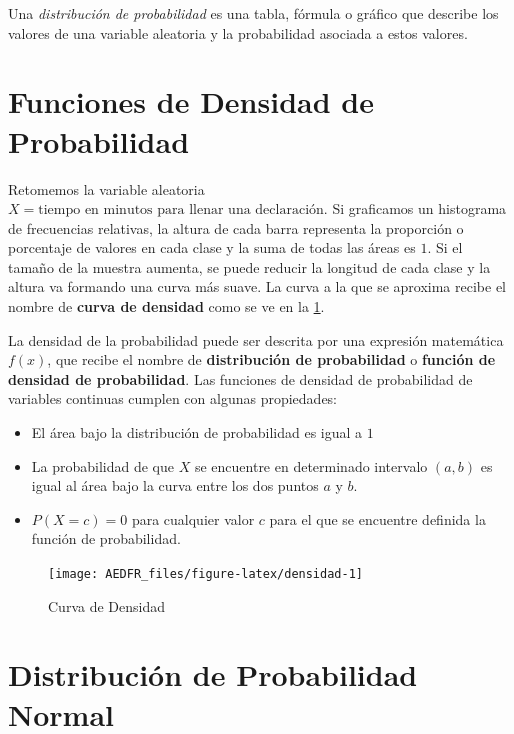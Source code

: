 \documentclass[letterpaper,]{book}
\providecommand{\tightlist}{%
  \setlength{\itemsep}{0pt}\setlength{\parskip}{0pt}}
\begin{document}
Una \emph{distribución de probabilidad} es una tabla, fórmula o gráfico que describe los valores de una variable aleatoria y la probabilidad asociada a estos valores.

\hypertarget{funciones-de-densidad-de-probabilidad}{%
\section{Funciones de Densidad de Probabilidad}\label{funciones-de-densidad-de-probabilidad}}

Retomemos la variable aleatoria \(X= \text{tiempo en minutos para llenar una declaración}\). Si graficamos un histograma de frecuencias relativas, la altura de cada barra representa la proporción o porcentaje de valores en cada clase y la suma de todas las áreas es \(1\). Si el tamaño de la muestra aumenta, se puede reducir la longitud de cada clase y la altura va formando una curva más suave. La curva a la que se aproxima recibe el nombre de \textbf{curva de densidad} como se ve en la \ref{fig:densidad}.

La densidad de la probabilidad puede ser descrita por una expresión matemática \(f\left(x\right)\), que recibe el nombre de \textbf{distribución de probabilidad} o \textbf{función de densidad de probabilidad}. Las funciones de densidad de probabilidad de variables continuas cumplen con algunas propiedades:

\begin{itemize}
\tightlist
\item
  El área bajo la distribución de probabilidad es igual a \(1\)
\item
  La probabilidad de que \(X\) se encuentre en determinado intervalo \(\left(a,b\right)\) es igual al área bajo la curva entre los dos puntos \(a\) y \(b\).
\item
  \(P\left(X=c\right)=0\) para cualquier valor \(c\) para el que se encuentre definida la función de probabilidad.
\end{itemize}

\begin{figure}[h!]

{\centering \texttt{[image: AEDFR\_files/figure-latex/densidad-1]} 

}

\caption{Curva de Densidad}\label{fig:densidad}
\end{figure}

\hypertarget{distribucion-de-probabilidad-normal}{%
\section{Distribución de Probabilidad Normal}\label{distribucion-de-probabilidad-normal}}
\end{document}
